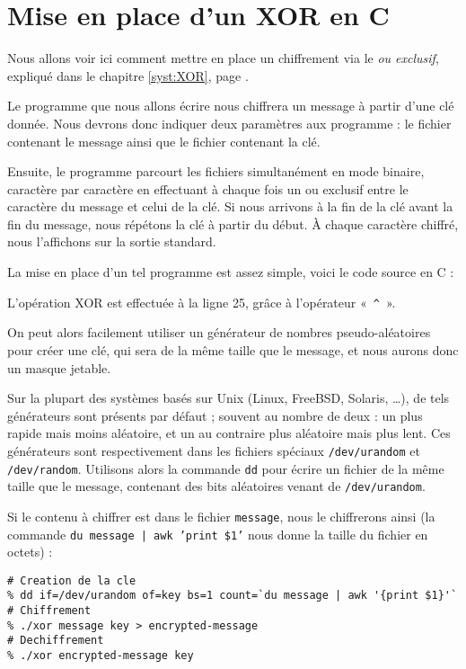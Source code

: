 \chapter{Mise en place d'un XOR en C}
Nous allons voir ici comment mettre en place un chiffrement via le
\emph{ou exclusif}, expliqué dans le chapitre \ref{syst:XOR}, page
\pageref{syst:XOR}.

Le programme que nous allons écrire nous chiffrera un message à partir
d'une clé donnée. Nous devrons donc indiquer deux paramètres aux
programme : le fichier contenant le message ainsi que le fichier
contenant la clé.

Ensuite, le programme parcourt les fichiers simultanément en mode
binaire, caractère par caractère en effectuant à chaque fois un ou
exclusif entre le caractère du message et celui de la clé. Si nous
arrivons à la fin de la clé avant la fin du message, nous répétons la
clé à partir du début. À chaque caractère chiffré, nous l'affichons
sur la sortie standard.

La mise en place d'un tel programme est assez simple, voici le code
source en C : 
\lstset{language=C}


L'opération XOR est effectuée à la ligne 25, grâce à l'opérateur
«~\texttt{\^}~».

On peut alors facilement utiliser un générateur de nombres
pseudo-aléatoires pour créer une clé, qui sera de la même taille que
le message, et nous aurons donc un masque jetable.

Sur la plupart des systèmes basés sur Unix (Linux, FreeBSD, Solaris,
\dots), de tels générateurs sont présents par défaut ; souvent au
nombre de deux : un plus rapide mais moins aléatoire, et un au
contraire plus aléatoire mais plus lent. Ces générateurs sont
respectivement dans les fichiers spéciaux \texttt{/dev/urandom} et
\texttt{/dev/random}. Utilisons alors la commande \texttt{dd} pour
écrire un fichier de la même taille que le message, contenant des bits
aléatoires venant de \texttt{/dev/urandom}.

Si le contenu à chiffrer est dans le fichier \texttt{message}, nous le
chiffrerons ainsi (la commande \texttt{du message | awk '{print \$1}'}
nous donne la taille du fichier en octets) : 
\lstset{language=csh}
\begin{lstlisting}
# Creation de la cle
% dd if=/dev/urandom of=key bs=1 count=`du message | awk '{print $1}'`
# Chiffrement
% ./xor message key > encrypted-message
# Dechiffrement
% ./xor encrypted-message key 
\end{lstlisting}

